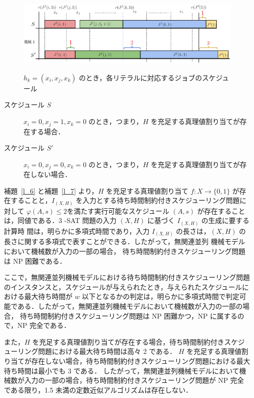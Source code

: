 \documentclass[12pt]{optlab-bachelor}
\begin{document}
\begin{figure}[h]
  \centering
  \includegraphics[width = 16cm]{figure/3SAT2.pdf}\\
  \caption{$h_k = (x_i, x_j, x_k)$ のとき，各リテラルに対応するジョブのスケジュール}
\end{figure}

\begin{description}
  \item[スケジュール $S$ ] $x_i = 0, x_j = 1, x_k = 0$ のとき，つまり，$H$ を充足する真理値割り当てが存在する場合．
  \item[スケジュール $S'$ ] $x_i = 0, x_j = 0, x_k = 0$ のとき，つまり，$H$ を充足する真理値割り当てが存在しない場合．
\end{description}

補題~\ref{l_6} と補題~\ref{l_7} より，$H$ を充足する真理値割り当て $f : X \to \{0,
1\}$ が存在することと，$I_{(X,H)}$ を入力とする待ち時間制約付きスケジューリング問題に対して $\varphi(A,s) \le 2$を満たす実行可能なスケジュール $(A,s)$ が存在することは，同値である．3 -SAT 問題の入力 $(X,H)$ に基づく $I_{(X,H)}$ の生成に要する計算時
間は，明らかに多項式時間であり，入力 $I_{(X,H)}$ の長さは，$(X, H)$
の長さに関する多項式で表すことができる．したがって，無関連並列
機械モデルにおいて機械数が入力の一部の場合， 待ち時間制約付きスケジューリング問題は NP 困難である．

ここで，無関連並列機械モデルにおける待ち時間制約付きスケジューリング問題のインスタンスと，スケジュールが与えられたとき，与えられたスケジュールにおける最大待ち時間が $w$ 以下となるかの判定は，明らかに多項式時間で判定可能である．したがって，無関連並列機械モデルにおいて機械数が入力の一部の場合， 待ち時間制約付きスケジューリング問題は NP 困難かつ，NP に属するので，NP 完全である．

また，$H$ を充足する真理値割り当てが存在する場合，待ち時間制約付きスケジューリング問題における最大待ち時間は高々 2 である．
$H$ を充足する真理値割り当てが存在しない場合，待ち時間制約付きスケジューリング問題における最大待ち時間は最小でも 3 である．
したがって，無関連並列機械モデルにおいて機械数が入力の一部の場合，待ち時間制約付きスケジューリング問題が NP 完全である限り，1.5 未満の定数近似アルゴリズムは存在しない．
\end{document}
